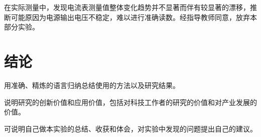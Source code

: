 \documentclass{thuemp}
\begin{document}
在实际测量中，发现电流表测量值整体变化趋势并不显著而伴有较显著的漂移，推断可能原因为电源输出电压不稳定，难以进行准确读数。经指导教师同意，放弃本部分实验。

\section{结论}
用准确、精炼的语言归纳总结使用的方法以及研究结果。

说明研究的创新价值和应用价值，包括对科技工作者的研究的价值和对产业发展的价值。

可说明自己做本实验的总结、收获和体会，对实验中发现的问题提出自己的建议。



\renewcommand\refname{\heiti\wuhao\centerline{参考文献}\global\def\refname{参考文献}}
\vskip 12pt


\let\OLDthebibliography\thebibliography
\renewcommand\thebibliography[1]{
  \OLDthebibliography{#1}
  \setlength{\parskip}{0pt}
  \setlength{\itemsep}{0pt plus 0.3ex}
}

{
\renewcommand{\baselinestretch}{0.9}
\liuhao


}
\end{document}
